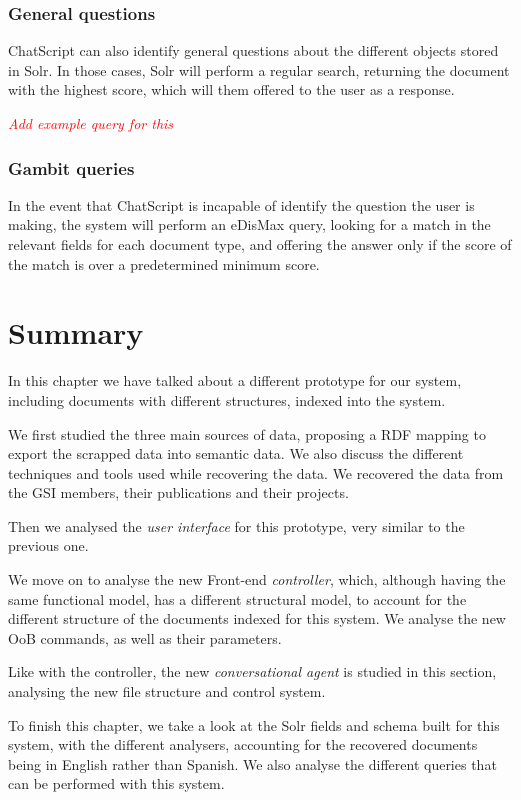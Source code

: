 \subsubsection{General questions}

ChatScript can also identify general questions about the different objects stored in Solr. In those cases, Solr will perform a regular search, returning the document with the highest score, which will them offered to the user as a response.

\emph{\textcolor{red}{Add example query for this}}

\subsubsection{Gambit queries}

In the event that ChatScript is incapable of identify the question the user is making, the system will perform an \ac{eDisMax} query, looking for a match in the relevant fields for each document type, and offering the answer only if the score of the match is over a predetermined minimum score.

\section{Summary}

In this chapter we have talked about a different prototype for our system, including documents with different structures, indexed into the system.

We first studied the three main sources of data, proposing a RDF mapping to export the scrapped data into semantic data. We also discuss the different techniques and tools used while recovering the data. We recovered the data from the GSI members, their publications and their projects.

Then we analysed the \emph{user interface} for this prototype, very similar to the previous one.

We move on to analyse the new Front-end \emph{controller}, which, although having the same functional model, has a different structural model, to account for the different structure of the documents indexed for this system. We analyse the new \ac{OoB} commands, as well as their parameters.

Like with the controller, the new \emph{conversational agent} is studied in this section, analysing the new file structure and control system.

To finish this chapter, we take a look at the Solr fields and schema built for this system, with the different analysers, accounting for the recovered documents being in English rather than Spanish. We also analyse the different queries that can be performed with this system.